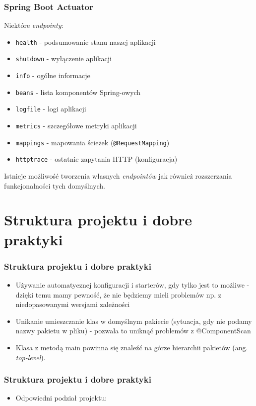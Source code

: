 \documentclass{beamer}
\begin{document}
\begin{frame}
\frametitle{Spring Boot Actuator}
Niektóre \textit{endpointy}:
\begin{itemize}
\item \lstinline{health} - podsumowanie stanu naszej aplikacji
\item \lstinline{shutdown} - wyłączenie aplikacji
\item \lstinline{info} - ogólne informacje
\item \lstinline{beans} - lista komponentów Spring-owych
\item \lstinline{logfile} - logi aplikacji
\item \lstinline{metrics} - szczegółowe metryki aplikacji
\item \lstinline{mappings} - mapowania ścieżek (\lstinline{@RequestMapping})
\item \lstinline{httptrace} - ostatnie zapytania HTTP (konfiguracja)
\end{itemize}
Istnieje możliwość tworzenia własnych \textit{endpointów} jak również rozszerzania funkcjonalności tych domyślnych.
\end{frame}

\section{Struktura projektu i dobre praktyki}

\begin{frame}
\frametitle{Struktura projektu i dobre praktyki}
\begin{itemize}
\item Używanie automatycznej konfiguracji i starterów, gdy tylko jest to możliwe - dzięki temu mamy pewność, że nie będziemy mieli problemów np. z niedopasowanymi wersjami zależności
\item Unikanie umieszczanie klas w domyślnym pakiecie (sytuacja, gdy nie podamy nazwy pakietu w pliku) - pozwala to uniknąć problemów z @ComponentScan
\item Klasa z metodą main powinna się znaleźć na górze hierarchii pakietów (ang. \textit{top-level}).
\end{itemize}
\end{frame}

\begin{frame}
\frametitle{Struktura projektu i dobre praktyki}
\begin{itemize}
\item Odpowiedni podział projektu:
\end{itemize}
\end{frame}
\end{document}
